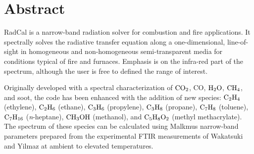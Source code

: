 \documentclass[11pt]{book}
\begin{document}
\begin{minipage}[t][9in][s]{6.25in}


\vspace{3in}

\large
{}

\vfill

\hspace{1in}

\end{minipage}

\newpage

\frontmatter

\pagestyle{plain}

\chapter{Abstract}

RadCal is a narrow-band radiation solver for combustion and fire applications. It spectrally solves the radiative transfer equation along a one-dimensional, line-of-sight in homogeneous and non-homogeneous semi-transparent media for conditions typical of fire and furnaces. Emphasis is on the infra-red part of the spectrum, although the user is free to defined the range of interest.

Originally developed with a spectral characterization of $\rm CO_2$, CO, $\rm H_2O$, $\rm CH_4$, and soot, the code has been enhanced with the addition of new species: $\rm C_2H_4$ (ethylene), $\rm C_2H_6$ (ethane), $\rm C_3H_6$ (propylene), $\rm C_3H_8$ (propane), $\rm C_7H_8$ (toluene), $\rm C_7H_{16}$ (\textit{n}-heptane), $\rm CH_3OH$ (methanol), and $\rm C_5H_8O_2$ (methyl methacrylate). The spectrum of these species can be calculated using Malkmus narrow-band parameters prepared from the experimental FTIR measurements of Wakatsuki and Yilmaz at ambient to elevated temperatures.
\end{document}
